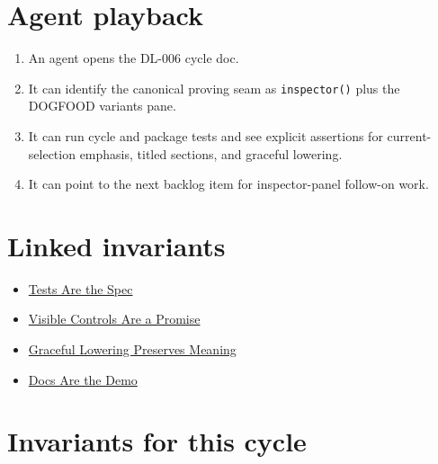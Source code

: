 \section{Agent playback}\label{record-173-agent-playback}

\begin{enumerate}
\def\labelenumi{\arabic{enumi}.}
\tightlist
\item
  An agent opens the DL-006 cycle doc.
\item
  It can identify the canonical proving seam as \texttt{i\allowbreak{}n\allowbreak{}s\allowbreak{}p\allowbreak{}e\allowbreak{}c\allowbreak{}t\allowbreak{}o\allowbreak{}r\allowbreak{}(\allowbreak{})} plus the DOGFOOD variants pane.
\item
  It can run cycle and package tests and see explicit assertions for current-selection emphasis, titled sections, and graceful lowering.
\item
  It can point to the next backlog item for inspector-panel follow-on work.
\end{enumerate}

\section{Linked invariants}\label{record-173-linked-invariants}

\begin{itemize}
\tightlist
\item
  \href{https://github.com/flyingrobots/bijou/blob/cbd70612140e7a450d764b3c7be1c6af878b99bc/docs/invariants/tests-are-the-spec.md}{Tests Are the Spec}
\item
  \href{https://github.com/flyingrobots/bijou/blob/cbd70612140e7a450d764b3c7be1c6af878b99bc/docs/invariants/visible-controls-are-a-promise.md}{Visible Controls Are a Promise}
\item
  \href{https://github.com/flyingrobots/bijou/blob/cbd70612140e7a450d764b3c7be1c6af878b99bc/docs/invariants/graceful-lowering-preserves-meaning.md}{Graceful Lowering Preserves Meaning}
\item
  \href{https://github.com/flyingrobots/bijou/blob/cbd70612140e7a450d764b3c7be1c6af878b99bc/docs/invariants/docs-are-the-demo.md}{Docs Are the Demo}
\end{itemize}

\section{Invariants for this cycle}\label{record-173-invariants-for-this-cycle}

